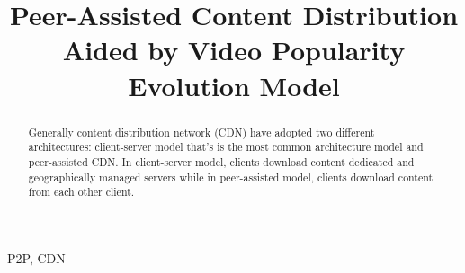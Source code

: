 \documentclass[10pt,final,journal,a4paper]{IEEEtran}
\begin{document}
%
\title{Peer-Assisted Content Distribution Aided by Video Popularity Evolution Model}

\author{
 \quad
{}
}








\maketitle


\begin{abstract}
Generally content distribution network (CDN) have adopted two different architectures: client-server model that's is the most common architecture model and peer-assisted CDN.  
In client-server model, clients download content dedicated and geographically managed servers while in peer-assisted model, clients download content from each other client.
\end{abstract}

\begin{IEEEkeywords}
P2P, CDN
\end{IEEEkeywords}





%
\end{document}
